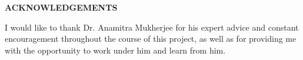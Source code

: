 \begin{center}
{\bf ACKNOWLEDGEMENTS}
\end{center}
I would like to thank Dr. Anamitra Mukherjee for his expert advice and constant encouragement throughout the course of this project, as well as for providing me with the opportunity to work under him and learn from him.

